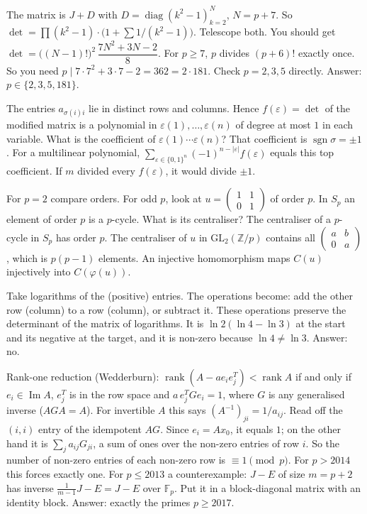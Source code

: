 \documentclass[11pt,a4paper]{article}
\begin{document}
The matrix is \(J+D\) with \(D=\operatorname{diag}(k^2-1)_{k=2}^{N}\), \(N=p+7\). So \(\det=\prod(k^2-1)\cdot\bigl(1+\sum 1/(k^2-1)\bigr)\). Telescope both.
You should get \(\det=\bigl((N-1)!\bigr)^2\,\dfrac{7N^2+3N-2}{8}\). For \(p\ge7\), \(p\) divides \((p+6)!\) exactly once. So you need \(p\mid 7\cdot7^2+3\cdot7-2=362=2\cdot181\). Check \(p=2,3,5\) directly.
Answer: \(p\in\{2,3,5,181\}\).

The entries \(a_{\sigma(i)i}\) lie in distinct rows and columns. Hence \(f(\varepsilon)=\det\) of the modified matrix is a polynomial in \(\varepsilon(1),\dots,\varepsilon(n)\) of degree at most \(1\) in each variable. What is the coefficient of \(\varepsilon(1)\cdots\varepsilon(n)\)?
That coefficient is \(\operatorname{sgn}\sigma=\pm1\). For a multilinear polynomial, \(\sum_{\varepsilon\in\{0,1\}^n}(-1)^{n-|\varepsilon|}f(\varepsilon)\) equals this top coefficient. If \(m\) divided every \(f(\varepsilon)\), it would divide \(\pm1\).

For \(p=2\) compare orders. For odd \(p\), look at \(u=\begin{pmatrix}1&1\\0&1\end{pmatrix}\) of order \(p\). In \(S_p\) an element of order \(p\) is a \(p\)-cycle. What is its centraliser?
The centraliser of a \(p\)-cycle in \(S_p\) has order \(p\). The centraliser of \(u\) in \(\mathrm{GL}_2(\mathbb Z/p)\) contains all \(\begin{pmatrix}a&b\\0&a\end{pmatrix}\), which is \(p(p-1)\) elements. An injective homomorphism maps \(C(u)\) injectively into \(C(\varphi(u))\).

Take logarithms of the (positive) entries. The operations become: add the other row (column) to a row (column), or subtract it.
These operations preserve the determinant of the matrix of logarithms. It is \(\ln2(\ln4-\ln3)\) at the start and its negative at the target, and it is non-zero because \(\ln4\ne\ln3\). Answer: no.

Rank-one reduction (Wedderburn): \(\operatorname{rank}(A-ae_ie_j^T)<\operatorname{rank}A\) if and only if \(e_i\in\operatorname{Im}A\), \(e_j^T\) is in the row space and \(a\,e_j^TGe_i=1\), where \(G\) is any generalised inverse (\(AGA=A\)). For invertible \(A\) this says \((A^{-1})_{ji}=1/a_{ij}\).
Read off the \((i,i)\) entry of the idempotent \(AG\). Since \(e_i=Ax_0\), it equals \(1\); on the other hand it is \(\sum_j a_{ij}G_{ji}\), a sum of ones over the non-zero entries of row \(i\). So the number of non-zero entries of each non-zero row is \(\equiv1\pmod p\). For \(p>2014\) this forces exactly one.
For \(p\le2013\) a counterexample: \(J-E\) of size \(m=p+2\) has inverse \(\frac{1}{m-1}J-E=J-E\) over \(\mathbb F_p\). Put it in a block-diagonal matrix with an identity block. Answer: exactly the primes \(p\ge2017\).
\end{document}
